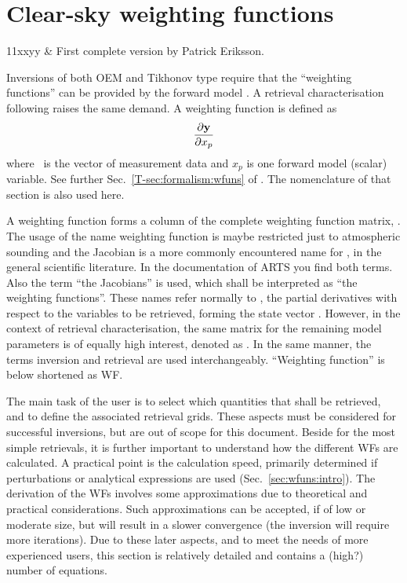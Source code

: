 \chapter{Clear-sky weighting functions}
 \label{sec:wfuns}

 \starthistory
 11xxyy & First complete version by Patrick Eriksson.\\
 \stophistory

\graphicspath{{Figs/wfuns/}}


Inversions of both OEM and Tikhonov type require that the ``weighting
functions'' can be provided by the forward model \citep[see
e.g.][]{eriksson:analy:00}. A retrieval characterisation following
\citet{rodgers:90,rodgers:00} raises the same demand. A weighting function is
defined as
\begin{equation}
  \frac{\partial \mathbf{y}}{\partial x_p}
  \label{eq:wfuns:ki}
\end{equation}
where \MsrVct\ is the vector of measurement data and $x_p$ is one forward model
(scalar) variable. See further Sec.~\ref{T-sec:formalism:wfuns} of \theory.
The nomenclature of that section is also used here.

A weighting function forms a column of the complete weighting function matrix,
\aWfnMtr{\SttVct}. The usage of the name weighting function is maybe restricted
just to atmospheric sounding and the Jacobian is a more commonly encountered
name for \aWfnMtr{\SttVct}, in the general scientific literature. In the
documentation of ARTS you find both terms. Also the term ``the Jacobians'' is
used, which shall be interpreted as ``the weighting functions''. These names
refer normally to \aWfnMtr{\SttVct}, the partial derivatives with respect to
the variables to be retrieved, forming the state vector \SttVct. However, in
the context of retrieval characterisation, the same matrix for the remaining
model parameters is of equally high interest, denoted as \aWfnMtr{\FrwMdlVct}.
In the same manner, the terms inversion and retrieval are used interchangeably.
``Weighting function'' is below shortened as WF.

The main task of the user is to select which quantities that shall be
retrieved, and to define the associated retrieval grids. These aspects must be
considered for successful inversions, but are out of scope for this document.
Beside for the most simple retrievals, it is further important to understand
how the different WFs are calculated. A practical point is the calculation
speed, primarily determined if perturbations or analytical expressions are used
(Sec.~\ref{sec:wfuns:intro}). The derivation of the WFs involves some
approximations due to theoretical and practical considerations. Such
approximations can be accepted, if of low or moderate size, but will result in
a slower convergence (the inversion will require more iterations). Due to these
later aspects, and to meet the needs of more experienced users, this section is
relatively detailed and contains a (high?) number of equations.

